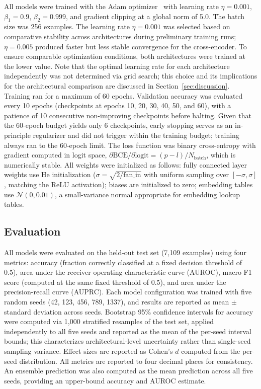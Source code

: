 \documentclass[journal]{IEEEtran}
\begin{document}
All models were trained with the Adam optimizer~\cite{kingma2014} with learning
rate $\eta = 0.001$, $\beta_1 = 0.9$, $\beta_2 = 0.999$, and gradient
clipping at a global norm of 5.0. The batch size was 256 examples. The
learning rate $\eta = 0.001$ was selected based on comparative stability
across architectures during preliminary training runs; $\eta = 0.005$ produced
faster but less stable convergence for the cross-encoder. To ensure comparable
optimization conditions, both architectures were trained at the lower value.
Note that the optimal learning rate for each architecture independently was
not determined via grid search; this choice and its implications for the
architectural comparison are discussed in Section~\ref{sec:discussion}.
Training ran for a maximum of 60 epochs. Validation accuracy was evaluated
every 10 epochs (checkpoints at epochs 10, 20, 30, 40, 50, and 60), with a
patience of 10 consecutive non-improving checkpoints before halting. Given that
the 60-epoch budget yields only 6 checkpoints, early stopping serves as an
in-principle regularizer and did not trigger within the training budget;
training always ran to the 60-epoch limit. The loss function was
binary cross-entropy with gradient computed in logit space, $\partial
\mathrm{BCE} / \partial \mathrm{logit} = (p - l) / N_\text{batch}$, which is
numerically stable. All weights were initialized as follows: fully connected layer weights use
He initialization ($\sigma = \sqrt{2/\text{fan\_in}}$ with uniform sampling
over $[-\sigma, \sigma]$, matching the ReLU activation); biases are initialized
to zero; embedding tables use $\mathcal{N}(0, 0.01)$, a small-variance normal
appropriate for embedding lookup tables.

\subsection{Evaluation}
\label{ssec:eval}

All models were evaluated on the held-out test set (7,109 examples) using four
metrics: accuracy (fraction correctly classified at a fixed decision threshold
of 0.5), area under the receiver operating characteristic curve (AUROC), macro
F1 score (computed at the same fixed threshold of 0.5), and area under the
precision-recall curve (AUPRC). Each
model configuration was trained with five random seeds (42, 123, 456, 789,
1337), and results are reported as mean $\pm$ standard deviation across seeds.
Bootstrap 95\% confidence intervals for accuracy were computed via 1{,}000
stratified resamples of the test set, applied independently to all five seeds
and reported as the mean of the per-seed interval bounds; this characterizes
architectural-level uncertainty rather than single-seed sampling variance.
Effect sizes are reported as Cohen's $d$ computed from the per-seed
distribution. All metrics are reported to four decimal places for consistency. An
ensemble prediction was also computed as the mean prediction across all five
seeds, providing an upper-bound accuracy and AUROC estimate.
\end{document}
